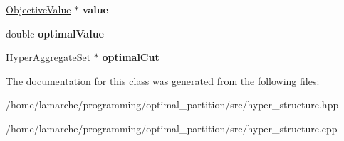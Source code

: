 \begin{DoxyCompactItemize}
\item 
\hypertarget{classHyperAggregate_a35e1fe6c4eef7996e4c3ad70534f8a0b}{\hyperlink{classObjectiveValue}{Objective\-Value} $\ast$ {\bfseries value}}\label{classHyperAggregate_a35e1fe6c4eef7996e4c3ad70534f8a0b}

\item 
\hypertarget{classHyperAggregate_a6e1560f410a9038d03ee4a1aefb482f5}{double {\bfseries optimal\-Value}}\label{classHyperAggregate_a6e1560f410a9038d03ee4a1aefb482f5}

\item 
\hypertarget{classHyperAggregate_a5e3aa280f0a438a085a61847d8299a92}{Hyper\-Aggregate\-Set $\ast$ {\bfseries optimal\-Cut}}\label{classHyperAggregate_a5e3aa280f0a438a085a61847d8299a92}

\end{DoxyCompactItemize}


The documentation for this class was generated from the following files\-:\begin{DoxyCompactItemize}
\item 
/home/lamarche/programming/optimal\-\_\-partition/src/hyper\-\_\-structure.\-hpp\item 
/home/lamarche/programming/optimal\-\_\-partition/src/hyper\-\_\-structure.\-cpp\end{DoxyCompactItemize}
